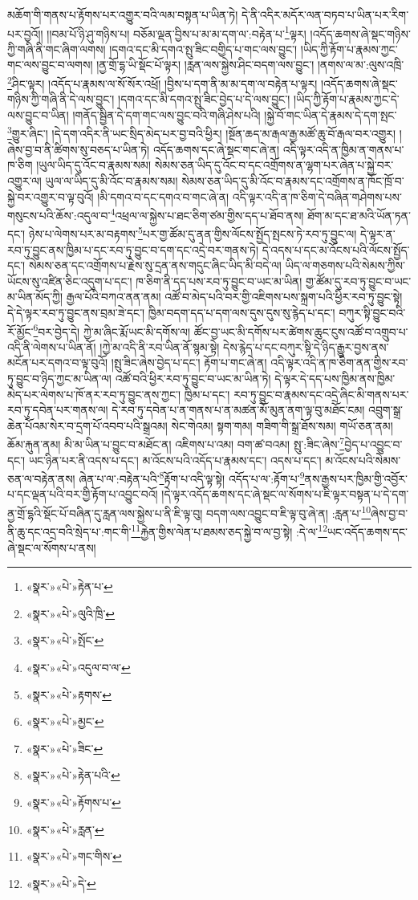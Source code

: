 མཆོག་གི་གནས་པ་རྟོགས་པར་འགྱུར་བའི་ལམ་བསྟན་པ་ཡིན་ཏེ། དེ་ནི་འདིར་མདོར་ལན་བཏབ་པ་ཡིན་པར་རིག་པར་བྱའོ།། །།བམ་པོ་ཉི་ཤུ་གཉིས་པ། བཅོམ་ལྡན་བྱིས་པ་མ་མ་དག་ལ་:བརྟེན་པ་\footnote{«སྣར་»«པེ་»རྟེན་པ་}ལྟར། །འདོད་ཆགས་ཞེ་སྡང་གཉིས་ཀྱི་གཞི་ནི་གང་ཞིག་ལགས། །དགའ་དང་མི་དགའ་སྤུ་ཟིང་བགྱིད་པ་གང་ལས་བྱུང་། །ཡིད་ཀྱི་རྟོག་པ་རྣམས་ཀྱང་གང་ལས་བྱུང་བ་ལགས། །ནྱ་གྲོ་དྷ་ཡི་སྡོང་པོ་ལྟར། །རླན་ལས་སྐྱེས་ཤིང་བདག་ལས་བྱུང་། །ནགས་ལ་མ་:ལུས་འཁྲི་\footnote{«སྣར་»«པེ་»ལུའི་ཁྲི་}ཤིང་ལྟར། །འདོད་པ་རྣམས་ལ་སོ་སོར་འཕྲོ། །བྱིས་པ་དག་ནི་མ་མ་དག་ལ་བརྟེན་པ་ལྟར། །འདོད་ཆགས་ཞེ་སྡང་གཉིས་ཀྱི་གཞི་ནི་དེ་ལས་བྱུང་། །དགའ་དང་མི་དགའ་སྤུ་ཟིང་བྱེད་པ་དེ་ལས་བྱུང་། །ཡིད་ཀྱི་རྟོག་པ་རྣམས་ཀྱང་དེ་ལས་བྱུང་བ་ཡིན། །གནོད་སྦྱིན་དེ་དག་གང་ལས་བྱུང་བའི་གཞི་ཤེས་པའི། །སྐྱེ་བོ་གང་ཡིན་དེ་རྣམས་དེ་དག་སྤང་\footnote{«སྣར་»«པེ་»སྤོང་}གྱུར་ཞིང་། །དེ་དག་འདིར་ནི་ཡང་སྲིད་མེད་པར་བྱ་བའི་ཕྱིར། །སྔོན་ཆད་མ་རྒལ་རྒྱ་མཚོ་ཆུ་བོ་རྒལ་བར་འགྱུར། །ཞེས་བྱ་བ་ནི་ཚིགས་སུ་བཅད་པ་ཡིན་ཏེ། འདོད་ཆགས་དང་ཞེ་སྡང་གང་ཞེ་ན། འདི་ལྟར་འདི་ན་ཁྱིམ་ན་གནས་པ་ཁ་ཅིག །ཡུལ་ཡིད་དུ་འོང་བ་རྣམས་སམ། སེམས་ཅན་ཡིད་དུ་འོང་བ་དང་འགྲོགས་ན་ལྷག་པར་ཞེན་པ་སྐྱེ་བར་འགྱུར་ལ། ཡུལ་ལ་ཡིད་དུ་མི་འོང་བ་རྣམས་སམ། སེམས་ཅན་ཡིད་དུ་མི་འོང་བ་རྣམས་དང་འགྲོགས་ན་ཁོང་ཁྲོ་བ་སྐྱེ་བར་འགྱུར་བ་ལྟ་བུའོ། །མི་དགའ་བ་དང་དགའ་བ་གང་ཞེ་ན། འདི་ལྟར་འདི་ན་ཁ་ཅིག་དེ་བཞིན་གཤེགས་པས་གསུངས་པའི་ཆོས་:འདུལ་བ་\footnote{«སྣར་»«པེ་»འདུལ་བ་ལ་}འཕྲལ་ལ་སྐྱེས་པ་ཐང་ཅིག་ཙམ་གྱིས་དད་པ་ཐོབ་ནས། ཐོག་མ་དང་ཐ་མའི་ཡོན་ཏན་དང་། ཉེས་པ་ལེགས་པར་མ་བརྟགས་\footnote{«སྣར་»«པེ་»རྟགས་}པར་གྱ་ཚོམ་དུ་ནན་གྱིས་ལོངས་སྤྱོད་སྤངས་ཏེ་རབ་ཏུ་བྱུང་ལ། དེ་ལྟར་ན་རབ་ཏུ་བྱུང་ནས་ཁྱིམ་པ་དང་རབ་ཏུ་བྱུང་བ་དག་དང་འདྲེ་བར་གནས་ཏེ། དེ་འདས་པ་དང་མ་འོངས་པའི་ལོངས་སྤྱོད་དང་། སེམས་ཅན་དང་འགྲོགས་པ་རྗེས་སུ་དྲན་ནས་གདུང་ཞིང་ཡིད་མི་བདེ་ལ། ཡིད་ལ་གཅགས་པའི་སེམས་ཀྱིས་ཡོངས་སུ་འཛིན་ཅིང་འདུག་པ་དང་། ཁ་ཅིག་ནི་དད་པས་རབ་ཏུ་བྱུང་བ་ཡང་མ་ཡིན། གྱ་ཚོམ་དུ་རབ་ཏུ་བྱུང་བ་ཡང་མ་ཡིན་མོད་ཀྱི། རྒྱལ་པོའི་བཀའ་ནན་ནམ། འཚོ་བ་མེད་པའི་བར་གྱི་འཇིགས་པས་སྐྲག་པའི་ཕྱིར་རབ་ཏུ་བྱུང་སྟེ། དེ་དེ་ལྟར་རབ་ཏུ་བྱུང་ནས་བྲམ་ཟེ་དང་། ཁྱིམ་བདག་དད་པ་དག་ལས་དུས་དུས་སུ་རྙེད་པ་དང་། བཀུར་སྟི་བྱུང་བའི་རོ་མྱོང་\footnote{«སྣར་»«པེ་»མྱང་}བར་བྱེད་དེ། ཀྱེ་མ་ཞིང་རྨོ་ཡང་མི་དགོས་ལ། ཚོང་བྱ་ཡང་མི་དགོས་པར་ཚེགས་ཆུང་ངུས་འཚོ་བ་འགྲུབ་པ་འདི་ནི་ལེགས་པ་ཡིན་ནོ། །ཀྱེ་མ་འདི་ནི་རབ་ཡིན་ནོ་སྙམ་སྟེ། དེས་རྙེད་པ་དང་བཀུར་སྟི་དེ་ཉིད་རྒྱུར་བྱས་ནས་མངོན་པར་དགའ་བ་ལྟ་བུའོ། །སྤུ་ཟིང་ཞེས་བྱེད་པ་དང་། རྟོག་པ་གང་ཞེ་ན། འདི་ལྟར་འདི་ན་ཁ་ཅིག་ནན་གྱིས་རབ་ཏུ་བྱུང་བ་ཉིད་ཀྱང་མ་ཡིན་ལ། འཚོ་བའི་ཕྱིར་རབ་ཏུ་བྱུང་བ་ཡང་མ་ཡིན་ཏེ། དེ་ལྟར་དེ་དད་པས་ཁྱིམ་ནས་ཁྱིམ་མེད་པར་ལེགས་པ་ཁོ་ནར་རབ་ཏུ་བྱུང་ནས་ཀྱང་། ཁྱིམ་པ་དང་། རབ་ཏུ་བྱུང་བ་རྣམས་དང་འདྲེ་ཞིང་མི་གནས་པར་རབ་ཏུ་དབེན་པར་གནས་ལ། དེ་རབ་ཏུ་དབེན་པ་ན་གནས་པ་ན་མཚན་མོ་མུན་ནག་ལྟ་བུ་མཐོང་ངམ། འབྲུག་སྒྲ་ཆེན་པོའམ་སེར་བ་དྲག་པོ་འབབ་པའི་སྒྲའམ། སེང་གེའམ། སྟག་གམ། གཟིག་གི་སྒྲ་ཐོས་སམ། གཡོ་ཅན་ནམ། ཆོམ་རྐུན་ནམ། མི་མ་ཡིན་པ་བྱུང་བ་མཐོང་ན། འཇིགས་པ་འམ། བག་ཚ་བའམ། སྤུ་:ཟིང་ཞེས་\footnote{«སྣར་»«པེ་»ཟིང་}བྱེད་པ་འབྱུང་བ་དང་། ཡང་ཉིན་པར་ནི་འདས་པ་དང་། མ་འོངས་པའི་འདོད་པ་རྣམས་དང་། འདས་པ་དང་། མ་འོངས་པའི་སེམས་ཅན་ལ་བརྟེན་ནས། ཞེན་པ་ལ་:བརྟེན་པའི་\footnote{«སྣར་»«པེ་»རྟེན་པའི་}རྟོག་པ་འདི་ལྟ་སྟེ། འདོད་པ་ལ་:རྟོག་པ་\footnote{«སྣར་»«པེ་»རྟོགས་པ་}ནས་རྒྱས་པར་ཁྱིམ་གྱི་འབྱོར་པ་དང་ལྡན་པའི་བར་གྱི་རྟོག་པ་འབྱུང་བའོ། །དེ་ལྟར་འདོད་ཆགས་དང་ཞེ་སྡང་ལ་སོགས་པ་ཇི་ལྟར་བསྟན་པ་དེ་དག་ནྱ་གྲོ་དྷའི་སྡོང་པོ་བཞིན་དུ་རླན་ལས་སྐྱེས་པ་ནི་ཇི་ལྟ་བུ། བདག་ལས་འབྱུང་བ་ཇི་ལྟ་བུ་ཞེ་ན། :རླན་པ་\footnote{«སྣར་»«པེ་»རླན་}ཞེས་བྱ་བ་ནི་ཆུ་དང་འདྲ་བའི་སྲེད་པ་:གང་གི་\footnote{«སྣར་»«པེ་»གང་གིས་}རྐྱེན་གྱིས་ལེན་པ་ཐམས་ཅད་སྐྱེ་བ་ལ་བྱ་སྟེ། :དེ་ལ་\footnote{«སྣར་»«པེ་»དེ་}ཡང་འདོད་ཆགས་དང་ཞེ་སྡང་ལ་སོགས་པ་ནས། 